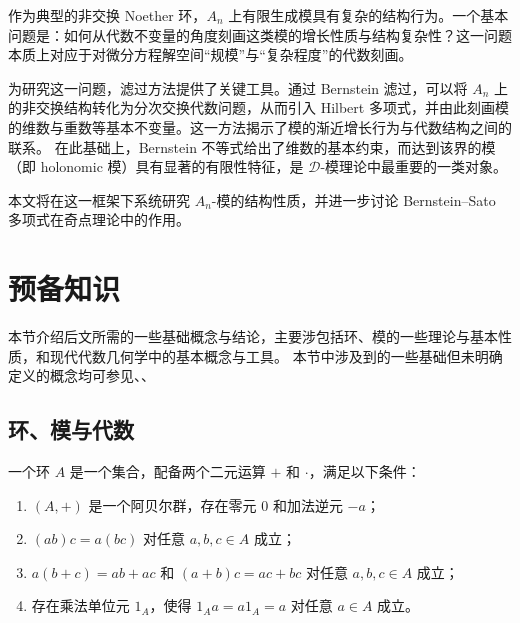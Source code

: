 \documentclass[12pt,a4paper]{ctexrep}   %
\begin{document}
作为典型的非交换 Noether 环，$A_n$ 上有限生成模具有复杂的结构行为。一个基本问题是：如何从代数不变量的角度刻画这类模的增长性质与结构复杂性？这一问题本质上对应于对微分方程解空间“规模”与“复杂程度”的代数刻画。

为研究这一问题，滤过方法提供了关键工具。通过 Bernstein 滤过，可以将 $A_n$ 上的非交换结构转化为分次交换代数问题，从而引入 Hilbert 多项式，并由此刻画模的维数与重数等基本不变量。这一方法揭示了模的渐近增长行为与代数结构之间的联系。
在此基础上，Bernstein 不等式给出了维数的基本约束，而达到该界的模（即 holonomic 模）具有显著的有限性特征，是 $\mathcal{D}$-模理论中最重要的一类对象。

本文将在这一框架下系统研究 $A_n$-模的结构性质，并进一步讨论 Bernstein--Sato 多项式在奇点理论中的作用。

\newpage
\chapter{预备知识}
本节介绍后文所需的一些基础概念与结论，主要涉包括环、模的一些理论与基本性质，和现代代数几何学中的基本概念与工具。 本节中涉及到的一些基础但未明确定义的概念均可参见\cite{atiyah2018introduction}、\cite{扶磊2006algebraic}、\cite{陈志杰2024代数基础}
\section{环、模与代数}
\begin{definition}
    一个环 $A$ 是一个集合，配备两个二元运算 $+$ 和 $\cdot$，满足以下条件：
    \begin{enumerate}[label=(\roman*)]
        \item $(A,+)$ 是一个阿贝尔群，存在零元 $0$ 和加法逆元 $-a$；
        \item  $(ab)c=a(bc)$ 对任意 $a,b,c\in A$ 成立；
        \item  $a(b+c)=ab+ac$ 和 $(a+b)c=ac+bc$ 对任意 $a,b,c\in A$ 成立；
        \item 存在乘法单位元 $1_A$，使得 $1_A a=a 1_A=a$ 对任意 $a\in A$ 成立。
    \end{enumerate}
\end{definition}
\end{document}
